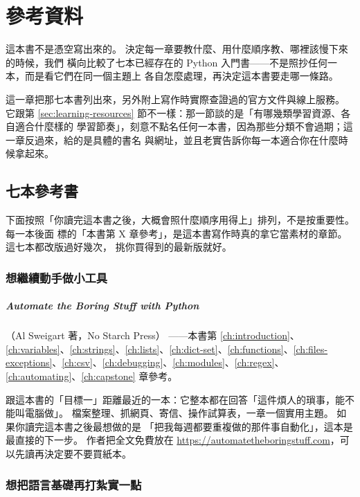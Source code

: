 \chapter*{參考資料}
\label{ch:references}

這本書不是憑空寫出來的。 決定每一章要教什麼、用什麼順序教、哪裡該慢下來的時候，我們
橫向比較了七本已經存在的 Python 入門書——不是照抄任何一本，而是看它們在同一個主題上
各自怎麼處理，再決定這本書要走哪一條路。

這一章把那七本書列出來，另外附上寫作時實際查證過的官方文件與線上服務。 它跟第
\ref{sec:learning-resources} 節不一樣：那一節談的是「有哪幾類學習資源、各自適合什麼樣的
學習節奏」，刻意不點名任何一本書，因為那些分類不會過期；這一章反過來，給的是具體的書名
與網址，並且老實告訴你每一本適合你在什麼時候拿起來。

\section*{七本參考書}

下面按照「你讀完這本書之後，大概會照什麼順序用得上」排列，不是按重要性。 每一本後面
標的「本書第 X 章參考」，是這本書寫作時真的拿它當素材的章節。 這七本都改版過好幾次，
挑你買得到的最新版就好。

\subsection*{想繼續動手做小工具}

\paragraph{Automate the Boring Stuff with Python}（Al Sweigart 著，No Starch Press）
——本書第 \ref{ch:introduction}、\ref{ch:variables}、\ref{ch:strings}、\ref{ch:lists}、\ref{ch:dict-set}、\ref{ch:functions}、\ref{ch:files-exceptions}、\ref{ch:csv}、\ref{ch:debugging}、\ref{ch:modules}、\ref{ch:regex}、\ref{ch:automating}、\ref{ch:capstone} 章參考。

跟這本書的「目標一」距離最近的一本：它整本都在回答「這件煩人的瑣事，能不能叫電腦做」。
檔案整理、抓網頁、寄信、操作試算表，一章一個實用主題。 如果你讀完這本書之後最想做的是
「把我每週都要重複做的那件事自動化」，這本是最直接的下一步。 作者把全文免費放在
\url{https://automatetheboringstuff.com}，可以先讀再決定要不要買紙本。

\subsection*{想把語言基礎再打紮實一點}

